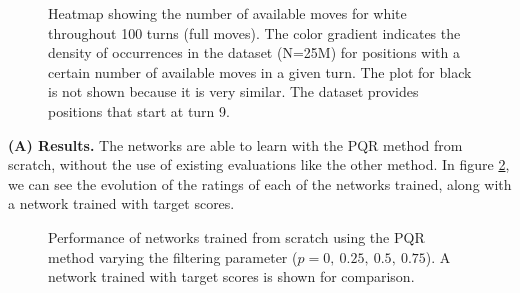 \begin{figure}[H]
\centering
{}
\caption{Heatmap showing the number of available moves for white throughout 100 turns (full moves). The color gradient indicates the density of occurrences in the dataset (N=25M) for positions with a certain number of available moves in a given turn. The plot for black is not shown because it is very similar. The dataset provides positions that start at turn 9.}
\label{avg-moves}
\end{figure}

\newpage
\textbf{(A) Results.} The networks are able to learn with the PQR method from scratch, without the use of existing evaluations like the other method. In figure \ref{pqr-evolution}, we can see the evolution of the ratings of each of the networks trained, along with a network trained with target scores.

\begin{figure}[H]
\centering
{}
\caption{Performance of networks trained from scratch using the PQR method varying the filtering parameter ($p=0,\ 0.25,\ 0.5,\ 0.75$). A network trained with target scores is shown for comparison.}
\label{pqr-evolution}
\end{figure}


